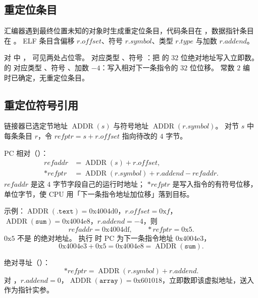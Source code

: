 \subsection{重定位条目}

汇编器遇到最终位置未知的对象时生成重定位条目，代码条目在 ，数据指针条目在 。
ELF 条目含偏移 $r.\mathit{offset}$、符号 $r.\mathit{symbol}$、类型 $r.\mathit{type}$ 与加数 $r.\mathit{addend}$。

对  中 ， 可见两处占位零。
 对应类型 、符号 ：把  的 $32$ 位绝对地址写入立即数。
 的  对应类型 、符号 、加数 $-4$：写入相对下一条指令的 $32$ 位位移。
常数 $2$ 编  时已确定，无重定位条目。

\subsection{重定位符号引用}

链接器已选定节地址 $\operatorname{ADDR}(s)$ 与符号地址 $\operatorname{ADDR}(r.\mathit{symbol})$。
对节 $s$ 中每条条目 $r$，令 $\mathit{refptr}=s+r.\mathit{offset}$ 指向待改的 $4$ 字节。

PC 相对（）：
\begin{align*}
\mathit{refaddr}&=\operatorname{ADDR}(s)+r.\mathit{offset},\\
\ast\mathit{refptr}
&=\operatorname{ADDR}(r.\mathit{symbol})+r.\mathit{addend}-\mathit{refaddr}.
\end{align*}
$\mathit{refaddr}$ 是这 $4$ 字节字段自己的运行时地址；
$\ast\mathit{refptr}$ 是写入指令的有符号位移，单位字节，使 CPU 用「下一条指令地址加位移」落到目标。

示例：$\operatorname{ADDR}(\texttt{.text})=0\mathrm{x}4004\mathrm{d}0$，$r.\mathit{offset}=0\mathrm{x}f$，
$\operatorname{ADDR}(\texttt{sum})=0\mathrm{x}4004\mathrm{e}8$，$r.\mathit{addend}=-4$，则
\[
\mathit{refaddr}=0\mathrm{x}4004\mathrm{df},
\qquad
\ast\mathit{refptr}=0\mathrm{x}5.
\]
$0\mathrm{x}5$ 不是  的绝对地址。
执行  时 PC 为下一条指令地址 $0\mathrm{x}4004\mathrm{e}3$，
\[
0\mathrm{x}4004\mathrm{e}3+0\mathrm{x}5=0\mathrm{x}4004\mathrm{e}8=\operatorname{ADDR}(\texttt{sum}).
\]

绝对寻址（）：
\[
\ast\mathit{refptr}=\operatorname{ADDR}(r.\mathit{symbol})+r.\mathit{addend}.
\]
对 ，$r.\mathit{addend}=0$，$\operatorname{ADDR}(\texttt{array})=0\mathrm{x}601018$，立即数即该虚拟地址，送入  作为指针实参。

